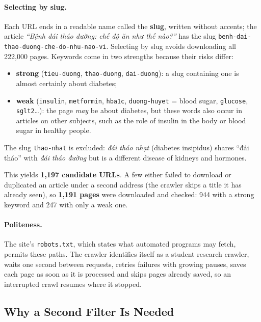 \documentclass[11pt, a4paper]{article}
\newcommand{\code}[1]{\texttt{#1}}
\begin{document}
\paragraph{Selecting by slug.} Each URL ends in a readable name called the \textbf{slug}, written without accents; the article \emph{``Bệnh đái tháo đường: chế độ ăn như thế nào?''} has the slug \code{benh-dai-thao-duong-che-do-nhu-nao-vi}. Selecting by slug avoids downloading all 222,000 pages. Keywords come in two strengths because their risks differ:
\begin{itemize}
    \item \textbf{strong} (\code{tieu-duong}, \code{thao-duong}, \code{dai-duong}): a slug containing one is almost certainly about diabetes;
    \item \textbf{weak} (\code{insulin}, \code{metformin}, \code{hba1c}, \code{duong-huyet} = blood sugar, \code{glucose}, \code{sglt2}\ldots): the page \emph{may} be about diabetes, but these words also occur in articles on other subjects, such as the role of insulin in the body or blood sugar in healthy people.
\end{itemize}
The slug \code{thao-nhat} is excluded: \emph{đái tháo nhạt} (diabetes insipidus) shares ``đái tháo'' with \emph{đái tháo đường} but is a different disease of kidneys and hormones.

This yields \textbf{1,197 candidate URLs}. A few either failed to download or duplicated an article under a second address (the crawler skips a title it has already seen), so \textbf{1,191 pages} were downloaded and checked: 944 with a strong keyword and 247 with only a weak one.

\paragraph{Politeness.} The site's \code{robots.txt}, which states what automated programs may fetch, permits these paths. The crawler identifies itself as a student research crawler, waits one second between requests, retries failures with growing pauses, saves each page as soon as it is processed and skips pages already saved, so an interrupted crawl resumes where it stopped.

\subsection{Why a Second Filter Is Needed}
\end{document}

